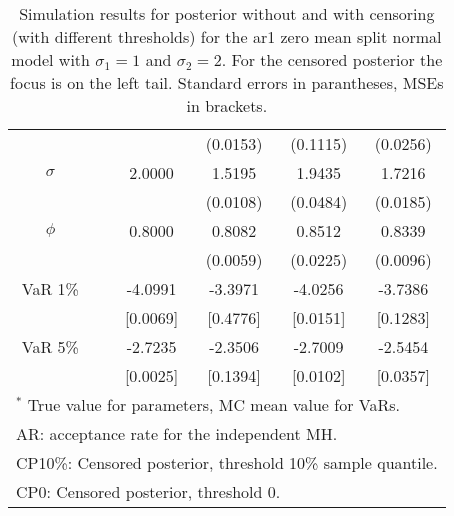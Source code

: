 {\begin{table}
\begin{tabular}{cc cccc}
&&   & (0.0153) & (0.1115) & (0.0256)  \\ 
$\sigma$&& 2.0000 & 1.5195 & 1.9435 & 1.7216  \\ 
&&   & (0.0108) & (0.0484) & (0.0185)  \\ 
$\phi$&& 0.8000 & 0.8082 & 0.8512 & 0.8339  \\ 
&&   & (0.0059) & (0.0225) & (0.0096)  \\ 
VaR 1\% && -4.0991 & -3.3971 & -4.0256 & -3.7386  \\ 
  && [0.0069] & [0.4776] & [0.0151] & [0.1283]  \\ 
VaR 5\% && -2.7235 & -2.3506 & -2.7009 & -2.5454  \\ 
 && [0.0025] & [0.1394] & [0.0102] & [0.0357]  \\ 
\hline 
\multicolumn{6}{l}{\footnotesize{$^*$ True value for parameters, MC mean value for VaRs.}}  \\ 
\multicolumn{6}{l}{\footnotesize{AR: acceptance rate for the independent MH.}}  \\ 
\multicolumn{6}{l}{\footnotesize{CP10\%: Censored posterior, threshold 10\% sample quantile.}}  \\ 
\multicolumn{6}{l}{\footnotesize{CP0: Censored posterior, threshold 0.}} 
\end{tabular}
 \caption{Simulation results for posterior without and with censoring (with different thresholds) for the ar1 zero mean split normal model with $\sigma_{1} = 1$ and $\sigma_{2} = 2$. For the censored posterior the focus is on the left tail. Standard errors in parantheses, MSEs in brackets.} 
\label{tab:ar1}  
\end{table}
}